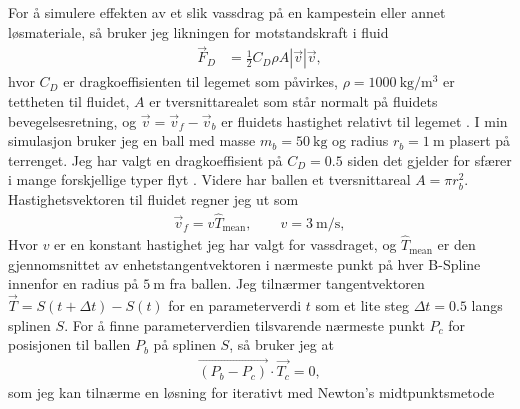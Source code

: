 \documentclass[norsk, doc, 11pt, a4paper]{apa7}  %
\begin{document}
For å simulere effekten av et slik vassdrag på en kampestein eller annet løsmateriale, så bruker jeg likningen for motstandskraft i fluid
\begin{align*}
	\vec{F}_{D} &= \frac{1}{2}C_{D}\rho A |\vec{v}|\vec{v},
\end{align*}
hvor \(C_{D}\) er dragkoeffisienten til legemet som påvirkes, \(\rho = \SI{1000}{\kilogram\per\metre\cubed}\) er tettheten til fluidet, \(A\) er tversnittarealet som står normalt på fluidets bevegelsesretning, og \(\vec{v} = \vec{v}_{f} - \vec{v}_{b}\) er fluidets hastighet relativt til legemet \parencite[s.7]{alexanderMovingBouldersFlash2016}. I min simulasjon bruker jeg en ball med masse \(m_{b} = \SI{50}{\kilogram}\) og radius \(r_{b} = \SI{1}{\metre}\) plasert på terrenget. Jeg har valgt en dragkoeffisient på \(C_{D} = 0.5\) siden det gjelder for sfærer i mange forskjellige typer flyt \parencite{hallDragSphere2023}. Videre har ballen et tversnittareal \(A = \pi r_{b}^{2}\).
Hastighetsvektoren til fluidet regner jeg ut som
\begin{align*}
	\vec{v}_{f} = v\hat{T}_{\text{mean}}, \qquad v = \SI{3}{\metre\per\second},
\end{align*}
Hvor \(v\) er en konstant hastighet jeg har valgt for vassdraget, og \(\hat{T}_{\text{mean}}\) er den gjennomsnittet av enhetstangentvektoren i nærmeste punkt på hver B-Spline innenfor en radius på \(\SI{5}{\metre}\) fra ballen. Jeg tilnærmer tangentvektoren \(\vec{T} = S(t+\Delta t) - S(t)\) for en parameterverdi \(t\) som et lite steg \(\Delta t = 0.5\) langs splinen \(S\). For å finne parameterverdien tilsvarende nærmeste punkt \(P_{c}\) for posisjonen til ballen \(P_{b}\) på splinen \(S\), så bruker jeg at
\begin{align*}
  	\vec{(P_{b} - P_{c})}\cdot\vec{T_{c}} = 0,
\end{align*}
som jeg kan tilnærme en løsning for iterativt med Newton's midtpunktsmetode
\end{document}
